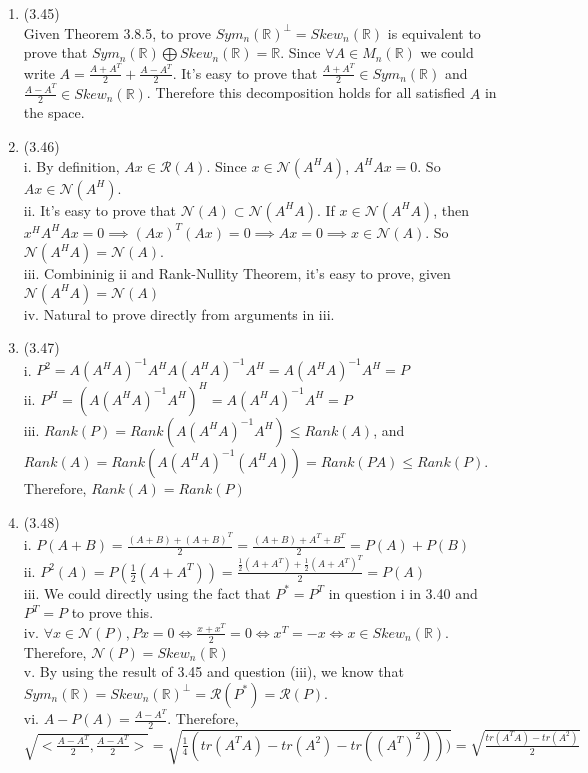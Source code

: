 \documentclass[letterpaper,12pt]{article}
\theoremstyle{definition}
\begin{document}
\begin{enumerate}
	\item(3.45)\\
	Given Theorem 3.8.5, to prove $Sym_{n}(\mathbb{R})^{\bot} = Skew_{n}(\mathbb{R})$ is equivalent to prove that $Sym_{n}(\mathbb{R}) \bigoplus Skew_{n}(\mathbb{R}) = \mathbb{R}$. Since $\forall A \in M_{n}(\mathbb{R})$	 we could write $A = \frac{A + A^{T}}{2} +  \frac{A - A^{T}}{2}$. It's easy to prove that $\frac{A + A^{T}}{2} \in Sym_{n}(\mathbb{R})$ and $ \frac{A - A^{T}}{2} \in  Skew_{n}(\mathbb{R})$. Therefore this decomposition holds for all satisfied $A$ in the space. \\

	\item(3.46)\\
	i. By definition, $Ax \in \mathcal{R}(A)$. Since $x \in \mathcal{N}(A^{H}A)$, $A^{H}Ax = 0$. So $Ax \in \mathcal{N}(A^{H})$.\\
	ii. It's easy to prove that $\mathcal{N}(A) \subset \mathcal{N}(A^{H}A)$. If $x \in \mathcal{N}(A^{H}A)$, then $x^{H}A^{H}Ax = 0 \implies (Ax)^{T}(Ax) = 0 \implies Ax = 0 \implies x \in \mathcal{N}(A)$. So $\mathcal{N}(A^{H}A) = \mathcal{N}(A)$.\\
	iii. Combininig ii and Rank-Nullity Theorem, it's easy to prove, given $\mathcal{N}(A^{H}A)= \mathcal{N}(A)$ \\
	iv. Natural to prove directly from arguments in iii.\\

	\item(3.47)\\
	i. $P^{2} = A(A^{H}A)^{-1}A^{H}A(A^{H}A)^{-1}A^{H} = A(A^{H}A)^{-1}A^{H} = P$\\
	ii. $P^{H} = (A(A^{H}A)^{-1}A^{H})^{H} = A(A^{H}A)^{-1}A^{H} = P$\\
	iii. $Rank(P)  = Rank(A(A^{H}A)^{-1}A^{H}) \leq Rank(A)$, and $Rank(A) = Rank(A(A^{H}A)^{-1}(A^{H}A)) = Rank(PA) \leq Rank(P)$. Therefore, $Rank(A) = Rank(P)$\\

	\item(3.48)\\
	i. $P(A+B) = \frac{(A + B) + (A + B)^{T}}{2} =  \frac{(A + B) + A^{T} + B^{T}}{2} = P(A) + P(B)$\\
	ii. $P^{2}(A) = P(\frac{1}{2}(A + A^{T})) = \frac{\frac{1}{2}(A + A^{T}) + \frac{1}{2}(A + A^{T})^{T}}{2} = P(A)$\\
	iii. We could directly using the fact that $P^{*} = P^{T}$ in question i in 3.40 and$ P^{T} = P$ to prove this.\\
	iv. $\forall x \in \mathcal{N}(P), Px = 0 \iff \frac{x + x^{T}}{2} = 0 \iff x^{T} = -x \iff x \in Skew_{n}(\mathbb{R})$. Therefore, $\mathcal{N}(P) = Skew_{n}(\mathbb{R})$\\
	v. By using the result of 3.45 and question (iii), we know that $Sym_{n}(\mathbb{R}) = Skew_{n}(\mathbb{R})^{\bot} = \mathcal{R}(P^{*}) = \mathcal{R}(P)$. \\
	vi. $A - P(A) = \frac{A - A^{T}}{2}$. Therefore, $\sqrt{<\frac{A - A^{T}}{2}, \frac{A - A^{T}}{2}>} = \sqrt{\frac{1}{4}(tr(A^{T}A) - tr(A^2) - tr((A^{T})^{2})))} = \sqrt{\frac{tr(A^{T}A) - tr(A^{2})}{2}}$\\


\end{enumerate}
\end{document}
